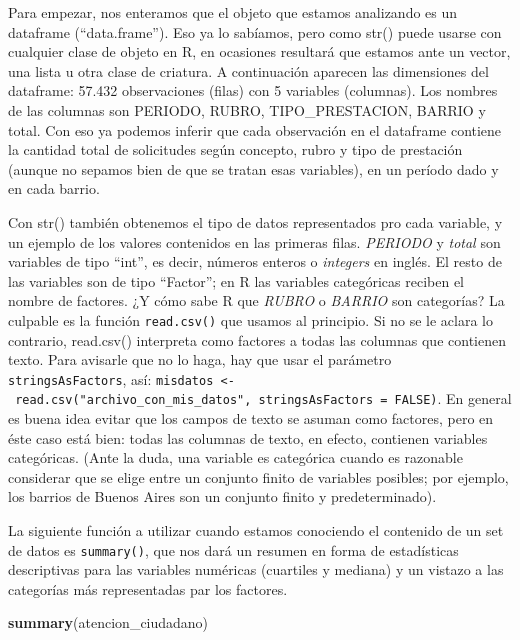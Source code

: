 \documentclass[spanish,]{book}
\newenvironment{Shaded}{\begin{snugshade}}{\end{snugshade}}
\newcommand{\KeywordTok}[1]{\textcolor[rgb]{0.13,0.29,0.53}{\textbf{#1}}}
\newcommand{\NormalTok}[1]{#1}
\begin{document}
Para empezar, nos enteramos que el objeto que estamos analizando es un dataframe (``data.frame''). Eso ya lo sabíamos, pero como str() puede usarse con cualquier clase de objeto en R, en ocasiones resultará que estamos ante un vector, una lista u otra clase de criatura. A continuación aparecen las dimensiones del dataframe: 57.432 observaciones (filas) con 5 variables (columnas). Los nombres de las columnas son PERIODO, RUBRO, TIPO\_PRESTACION, BARRIO y total. Con eso ya podemos inferir que cada observación en el dataframe contiene la cantidad total de solicitudes según concepto, rubro y tipo de prestación (aunque no sepamos bien de que se tratan esas variables), en un período dado y en cada barrio.

Con str() también obtenemos el tipo de datos representados pro cada variable, y un ejemplo de los valores contenidos en las primeras filas. \emph{PERIODO} y \emph{total} son variables de tipo ``int'', es decir, números enteros o \emph{integers} en inglés. El resto de las variables son de tipo ``Factor''; en R las variables categóricas reciben el nombre de factores. ¿Y cómo sabe R que \emph{RUBRO} o \emph{BARRIO} son categorías? La culpable es la función \texttt{read.csv()} que usamos al principio. Si no se le aclara lo contrario, read.csv() interpreta como factores a todas las columnas que contienen texto. Para avisarle que no lo haga, hay que usar el parámetro \texttt{stringsAsFactors}, así: \texttt{misdatos\ \textless{}-\ read.csv("archivo\_con\_mis\_datos",\ stringsAsFactors\ =\ FALSE)}. En general es buena idea evitar que los campos de texto se asuman como factores, pero en éste caso está bien: todas las columnas de texto, en efecto, contienen variables categóricas. (Ante la duda, una variable es categórica cuando es razonable considerar que se elige entre un conjunto finito de variables posibles; por ejemplo, los barrios de Buenos Aires son un conjunto finito y predeterminado).

La siguiente función a utilizar cuando estamos conociendo el contenido de un set de datos es \texttt{summary()}, que nos dará un resumen en forma de estadísticas descriptivas para las variables numéricas (cuartiles y mediana) y un vistazo a las categorías más representadas par los factores.

\begin{Shaded}
\begin{Highlighting}[]
\KeywordTok{summary}\NormalTok{(atencion_ciudadano)}
\end{Highlighting}
\end{Shaded}
\end{document}
